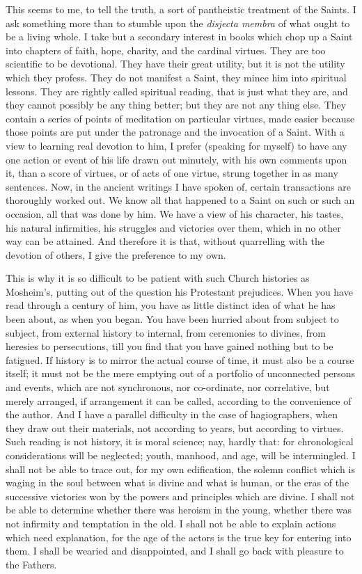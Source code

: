 This seems to me, to tell the truth, a sort of pantheistic
treatment of the Saints. I ask something more than to stumble upon the
\emph{disjecta membra} of what ought to be a living whole. I take but
a secondary interest in books which chop up a Saint into chapters of
faith, hope, charity, and the cardinal virtues. They are too
scientific to be devotional. They have their great utility, but it is
not the utility which they profess. They do not manifest a Saint, they
mince him into spiritual lessons. They are rightly called spiritual
reading, that is just what they are, and they cannot possibly be any
thing better; but they are not any thing else. They contain a series
of points of meditation on particular virtues, made easier because
those points are put under the patronage and the invocation of a
Saint. With a view to learning real devotion to him, I prefer
(speaking for myself) to have any one action or event of his life
drawn out minutely, with his own comments upon it, than a score of
virtues, or of acts of one virtue, strung together in as many
sentences. Now, in the ancient writings I have spoken of,
certain transactions are thoroughly worked out. We know all that
happened to a Saint on such or such an occasion, all that was done by
him. We have a view of his character, his tastes, his natural
infirmities, his struggles and victories over them, which in no other
way can be attained. And therefore it is that, without quarrelling
with the devotion of others, I give the preference to my own.

This is why it is so difficult to be patient with such Church
histories as Mosheim's, putting out of the question his Protestant
prejudices. When you have read through a century of him, you have as
little distinct idea of what he has been about, as when you began. You
have been hurried about from subject to subject, from external history
to internal, from ceremonies to divines, from heresies to
persecutions, till you find that you have gained nothing but to be
fatigued. If history is to mirror the actual course of time, it must
also be a course itself; it must not be the mere emptying out of a
portfolio of unconnected persons and events, which are not
synchronous, nor co-ordinate, nor correlative, but merely arranged, if
arrangement it can be called, according to the convenience of the
author. And I have a parallel difficulty in the case of hagiographers,
when they draw out their materials, not according to years, but
according to virtues. Such reading is not history, it is moral
science; nay, hardly that: for chronological considerations will be
neglected; youth, manhood, and age, will be intermingled. I shall not
be able to trace out, for my own edification, the solemn conflict
which is waging in the soul between what is divine and what is human,
or the eras of the successive victories won by the powers and
principles which are divine. I shall not be able to determine whether
there was heroism in the young, whether there was not infirmity
and temptation in the old. I shall not be able to explain actions
which need explanation, for the age of the actors is the true key for
entering into them. I shall be wearied and disappointed, and I shall
go back with pleasure to the Fathers.

